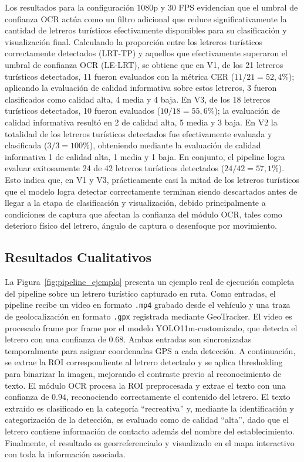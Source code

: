\documentclass[runningheads]{llncs}
\begin{document}
Los resultados para la configuración 1080p y 30 FPS evidencian que el 
umbral de confianza OCR actúa como un filtro adicional que reduce 
significativamente la cantidad de letreros turísticos efectivamente 
disponibles para su clasificación y visualización final. Calculando 
la proporción entre los letreros turísticos correctamente detectados 
(LRT-TP) y aquellos que efectivamente superaron el umbral de confianza 
OCR (LE-LRT), se obtiene que en V1, de los 21 letreros turísticos 
detectados, 11 fueron evaluados con la métrica CER ($11/21 = 52{,}4\%$); 
aplicando la evaluación de calidad informativa sobre estos letreros, 
3 fueron clasificados como calidad alta, 4 media y 4 baja. En V3, de 
los 18 letreros turísticos detectados, 10 fueron evaluados 
($10/18 = 55{,}6\%$); la evaluación de calidad informativa resultó en 
2 de calidad alta, 5 media y 3 baja. En V2 la totalidad de los 
letreros turísticos detectados fue efectivamente evaluada y clasificada 
($3/3 = 100\%$), obteniendo mediante la evaluación de calidad 
informativa 1 de calidad alta, 1 media y 1 baja. En conjunto, el 
pipeline logra evaluar exitosamente 24 de 42 letreros turísticos 
detectados ($24/42 = 57{,}1\%$). Esto indica que, en V1 y V3, 
prácticamente casi la mitad de los letreros turísticos que el modelo logra 
detectar correctamente terminan siendo descartados antes de llegar a 
la etapa de clasificación y visualización, debido principalmente a 
condiciones de captura que afectan la confianza del módulo OCR, tales 
como deterioro físico del letrero, ángulo de captura o desenfoque por 
movimiento.


\subsection{Resultados Cualitativos}

La Figura~\ref{fig:pipeline_ejemplo} presenta un ejemplo real de 
ejecución completa del pipeline sobre un letrero turístico capturado 
en ruta. Como entradas, el pipeline recibe un video en formato 
\texttt{.mp4} grabado desde el vehículo y una traza de geolocalización 
en formato \texttt{.gpx} registrada mediante GeoTracker. 
El video es procesado frame por frame por el modelo YOLO11m-customizado, que detecta 
el letrero con una confianza de $0.68$. Ambas entradas son sincronizadas 
temporalmente para asignar coordenadas GPS a cada detección. A 
continuación, se extrae la ROI correspondiente al letrero detectado 
y se aplica thresholding para binarizar la imagen, mejorando 
el contraste previo al reconocimiento de texto. El módulo OCR procesa 
la ROI preprocesada y extrae el texto con una confianza de $0.94$, 
reconociendo correctamente el contenido del letrero. El texto 
extraído es clasificado en la categoría ``recreativa'' y, 
mediante la identificación y categorización de la detección, es 
evaluado como de calidad ``alta'', dado que el letrero contiene 
información de contacto además del nombre del establecimiento. 
Finalmente, el resultado es georreferenciado y visualizado en el 
mapa interactivo con toda la información asociada.
\end{document}
